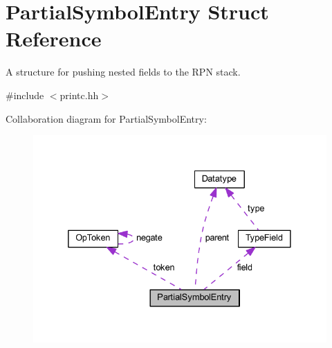 \hypertarget{struct_partial_symbol_entry}{}\section{Partial\+Symbol\+Entry Struct Reference}
\label{struct_partial_symbol_entry}


A structure for pushing nested fields to the R\+PN stack.  




{\ttfamily \#include $<$printc.\+hh$>$}



Collaboration diagram for Partial\+Symbol\+Entry\+:
\nopagebreak
\begin{figure}[H]
\begin{center}
\leavevmode
\includegraphics[width=332pt]{struct_partial_symbol_entry__coll__graph}
\end{center}
\end{figure}
